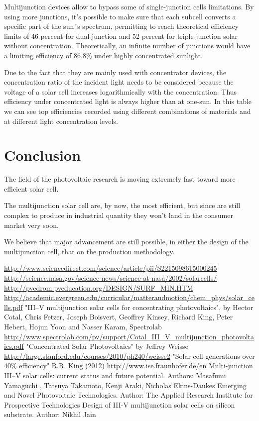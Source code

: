 \documentclass[11pt]{article} %
\begin{document}
Multijunction devices allow to bypass some of single-junction cells limitations. By using more junctions, it's possible to make sure that each subcell converts a specific part of the sun´s spectrum, permitting to reach theoretical efficiency limits of 46 percent for dual-junction and 52 percent for triple-junction solar without concentration. Theoretically, an infinite number of junctions would have a limiting efficiency of 86.8\% under highly concentrated sunlight.

Due to the fact that they are mainly used with concentrator devices, the concentration ratio of the incident light needs to be considered because the voltage of a solar cell increases logarithmically with the  concentration. Thus efficiency  under  concentrated  light is  always  higher  than  at one-sun. In this table we can see top efficiencies  recorded using different combinations of materials and at different light concentration levels.

\section{Conclusion}

The field of the photovoltaic research is moving extremely fast toward more efficient solar cell.

The multijunction solar cell are, by now, the most efficient, but since are still complex to produce in industrial quantity they won't land in the consumer market very soon.

We believe that major advancement are still possible, in either the design of the multijunction cell, that on the production methodology.

\begin{thebibliography}{9}
\bibitem{}
\url{http://www.sciencedirect.com/science/article/pii/S2215098615000245}
\bibitem{}
\url{http://science.nasa.gov/science-news/science-at-nasa/2002/solarcells/}
\bibitem{}
\url{http://pvcdrom.pveducation.org/DESIGN/SURF_MIN.HTM}
\bibitem{}
\url{http://academic.evergreen.edu/curricular/matterandmotion/chem_phys/solar_cells.pdf}
\bibitem{}
	"III–V multijunction solar cells for concentrating photovoltaics", by Hector Cotal, Chris Fetzer, Joseph Boisvert, Geoffrey Kinsey, Richard King, Peter Hebert, Hojun Yoon and Nasser Karam, Spectrolab \url{http://www.spectrolab.com/pv/support/Cotal_III_V_multijunction_photovoltaics.pdf}
\bibitem{}
	"Concentrated Solar Photovoltaics" by Jeffrey Weisse \url{http://large.stanford.edu/courses/2010/ph240/weisse2}
\bibitem{}
	"Solar cell generations over 40\% efficiency" R.R. King (2012) 
\bibitem{}
	\url{http://www.ise.fraunhofer.de/en}
\bibitem{}
	Multi-junction III–V solar cells: current status and future potential. Authors: Masafumi Yamaguchi , Tatsuya Takamoto, Kenji Araki, Nicholas Ekins-Daukes 
\bibitem{}
	Emerging and Novel Photovoltaic Technologies. Author: The Applied Research Institute for Prospective Technologies  
\bibitem{}
	Design of III-V multijunction solar cells on silicon substrate. Author: Nikhil Jain 

\end{thebibliography}
\end{document}
